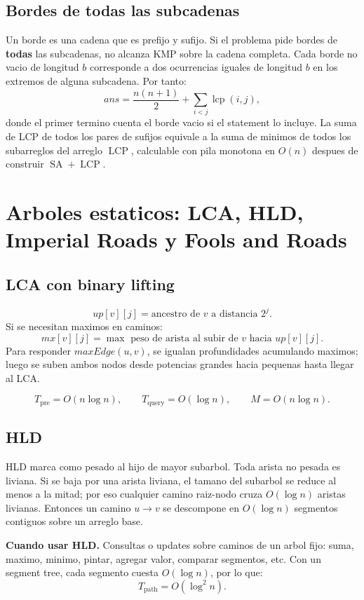 \documentclass[10pt]{article}
\newcommand{\bigO}{O}
\newcommand{\SA}{\operatorname{SA}}
\newcommand{\LCP}{\operatorname{LCP}}
\newcommand{\boxhead}[1]{\vspace{3pt}\textbf{#1.}}
\begin{document}
\subsection{Bordes de todas las subcadenas}
Un borde es una cadena que es prefijo y sufijo. Si el problema pide bordes de \textbf{todas} las subcadenas, no
alcanza KMP sobre la cadena completa. Cada borde no vacio de longitud \(b\) corresponde a dos ocurrencias iguales
de longitud \(b\) en los extremos de alguna subcadena. Por tanto:
\[
ans=\frac{n(n+1)}2+\sum_{i<j}\operatorname{lcp}(i,j),
\]
donde el primer termino cuenta el borde vacio si el statement lo incluye.
La suma de LCP de todos los pares de sufijos equivale a la suma de minimos de todos los subarreglos del arreglo
\(\LCP\), calculable con pila monotona en \(\bigO(n)\) despues de construir \(\SA+\LCP\).

\newpage

\section{Arboles estaticos: LCA, HLD, Imperial Roads y Fools and Roads}

\subsection{LCA con binary lifting}
\[
up[v][j]=\text{ancestro de }v\text{ a distancia }2^j.
\]
Si se necesitan maximos en caminos:
\[
mx[v][j]=\max\text{ peso de arista al subir de }v\text{ hacia }up[v][j].
\]
Para responder \(maxEdge(u,v)\), se igualan profundidades acumulando maximos; luego se suben ambos nodos
desde potencias grandes hacia pequenas hasta llegar al LCA.

\[
T_{\text{pre}}=\bigO(n\log n),\qquad T_{\text{query}}=\bigO(\log n),\qquad M=\bigO(n\log n).
\]

\subsection{HLD}
HLD marca como pesado al hijo de mayor subarbol. Toda arista no pesada es liviana. Si se baja por una arista
liviana, el tamano del subarbol se reduce al menos a la mitad; por eso cualquier camino raiz-nodo cruza
\(\bigO(\log n)\) aristas livianas. Entonces un camino \(u\to v\) se descompone en \(\bigO(\log n)\) segmentos
contiguos sobre un arreglo base.

\boxhead{Cuando usar HLD}
Consultas o updates sobre caminos de un arbol fijo: suma, maximo, minimo, pintar, agregar valor, comparar
segmentos, etc. Con un segment tree, cada segmento cuesta \(\bigO(\log n)\), por lo que:
\[
T_{\text{path}}=\bigO(\log^2 n).
\]
\end{document}
